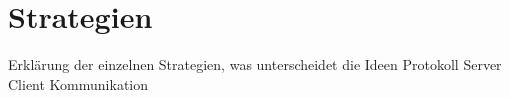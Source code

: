 \section*{Strategien}
Erklärung der einzelnen Strategien, was unterscheidet die Ideen
Protokoll Server Client Kommunikation